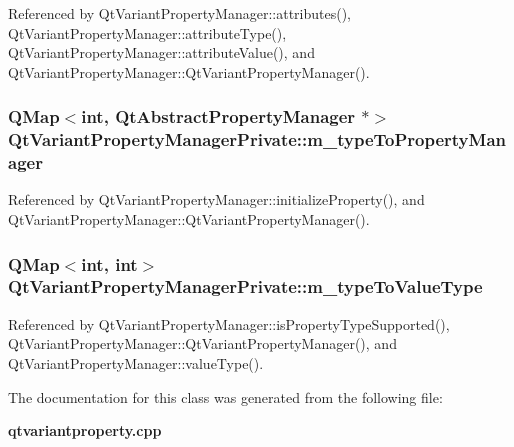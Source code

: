 Referenced by Qt\+Variant\+Property\+Manager\+::attributes(), Qt\+Variant\+Property\+Manager\+::attribute\+Type(), Qt\+Variant\+Property\+Manager\+::attribute\+Value(), and Qt\+Variant\+Property\+Manager\+::\+Qt\+Variant\+Property\+Manager().

\subsubsection[{m\+\_\+type\+To\+Property\+Manager}]{\setlength{\rightskip}{0pt plus 5cm}Q\+Map$<$int, {\bf Qt\+Abstract\+Property\+Manager} $\ast$$>$ Qt\+Variant\+Property\+Manager\+Private\+::m\+\_\+type\+To\+Property\+Manager}\label{classQtVariantPropertyManagerPrivate_afd40b562597c468f22b21d2e302ddc27}


Referenced by Qt\+Variant\+Property\+Manager\+::initialize\+Property(), and Qt\+Variant\+Property\+Manager\+::\+Qt\+Variant\+Property\+Manager().

\subsubsection[{m\+\_\+type\+To\+Value\+Type}]{\setlength{\rightskip}{0pt plus 5cm}Q\+Map$<$int, int$>$ Qt\+Variant\+Property\+Manager\+Private\+::m\+\_\+type\+To\+Value\+Type}\label{classQtVariantPropertyManagerPrivate_a99b1cb1f284479fc4caa9075b195d7c1}


Referenced by Qt\+Variant\+Property\+Manager\+::is\+Property\+Type\+Supported(), Qt\+Variant\+Property\+Manager\+::\+Qt\+Variant\+Property\+Manager(), and Qt\+Variant\+Property\+Manager\+::value\+Type().



The documentation for this class was generated from the following file\+:\begin{DoxyCompactItemize}
\item 
{\bf qtvariantproperty.\+cpp}\end{DoxyCompactItemize}

